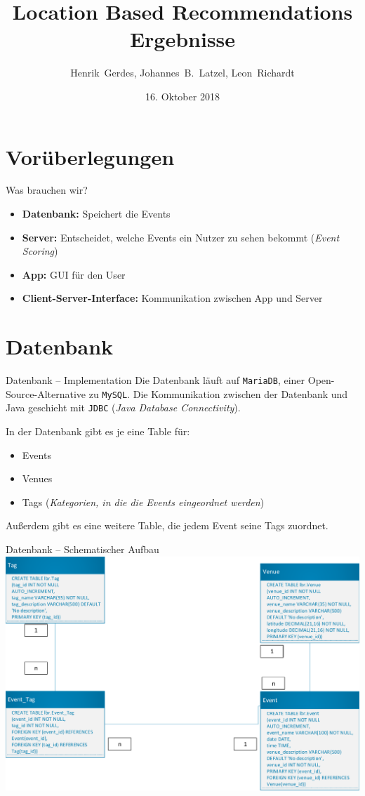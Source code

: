 \documentclass{beamer}
\title{Location Based Recommendations\\Ergebnisse}
\author[H.~Gerdes, J.B.~Latzel, L.~Richardt]{Henrik~Gerdes, Johannes~B.~Latzel, Leon~Richardt}
\institute{Universität Osnabrück}
\date[16.10.2018]{16. Oktober 2018}
\begin{document}
	
	\begin{frame}
		\titlepage
	\end{frame}

	\section{Vorüberlegungen}
	\begin{frame}{Was brauchen wir?}
			\begin{itemize}
				\item \textbf{Datenbank:} Speichert die Events
				\item \textbf{Server:} Entscheidet, welche Events ein Nutzer zu sehen bekommt (\textit{Event Scoring})
				\item \textbf{App:} GUI für den User
				\item \textbf{Client-Server-Interface:} Kommunikation zwischen App und Server
			\end{itemize}
	\end{frame}

	\section{Datenbank}
	\begin{frame}{Datenbank -- Implementation}
		Die Datenbank läuft auf \alert{\texttt{MariaDB}}, einer Open-Source-Alternative zu \texttt{MySQL}. Die Kommunikation zwischen der Datenbank und Java geschieht mit \alert{\texttt{JDBC}} (\textit{Java Database Connectivity}).
		
		\pause
		In der Datenbank gibt es je eine Table für:
		\begin{itemize}
			\item Events
			\item Venues
			\item Tags (\textit{Kategorien, in die die Events eingeordnet werden})
		\end{itemize}
		Außerdem gibt es eine weitere Table, die jedem Event seine Tags zuordnet.
		
	\end{frame}

	\begin{frame}{Datenbank -- Schematischer Aufbau}
		\centering\includegraphics[scale=0.5]{db_scheme}
	\end{frame}
\end{document}

